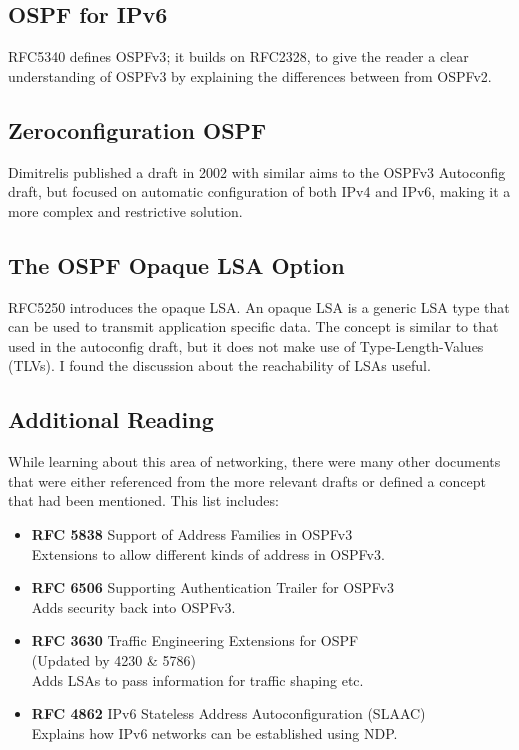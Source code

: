 \documentclass[12pt,a4paper,twoside]{report}
\begin{document}
\subsection{OSPF for IPv6}
RFC5340 defines OSPFv3\cite{rfc5340}; it builds on RFC2328, to give the
reader a clear understanding of OSPFv3 by explaining the differences between
from OSPFv2. 

\subsection{Zeroconfiguration OSPF}
Dimitrelis\cite{draft-dimitri-zospf-00} published a draft in 2002 with similar
aims to the OSPFv3 Autoconfig draft, but focused on automatic configuration of
both IPv4 and IPv6, making it a more complex and restrictive solution. 

\subsection{The OSPF Opaque LSA Option}
RFC5250\cite{rfc5250} introduces the opaque LSA\@. An opaque LSA is a generic
LSA type that can be used to transmit application specific data. The concept is
similar to that used in the autoconfig draft, but it does not make use
of Type-Length-Values (TLVs). I found the
discussion about the reachability of LSAs useful.

\subsection{Additional Reading}
While learning about this area of networking, there were many other documents
that were either referenced from the more relevant drafts or defined a concept
that had been mentioned. This list includes:

\begin{itemize} 
  \item {\bf RFC 5838} Support of Address Families in OSPFv3 \cite{rfc5838}
	\\ Extensions to allow different kinds of address in OSPFv3.
  
\item {\bf RFC 6506} Supporting Authentication Trailer for OSPFv3  \cite{rfc6506}
	\\ Adds security back into OSPFv3.

	\item {\bf RFC 3630}  Traffic Engineering Extensions
	for OSPF \cite{rfc3630} 
	\\ (Updated by 4230 \& 5786) \cite{rfc4230}\cite{rfc5786} 
	\\ Adds LSAs to pass information for traffic shaping etc.\@
  
\item {\bf RFC 4862} IPv6 Stateless Address Autoconfiguration (SLAAC) \cite{rfc4862}
	\\ Explains how IPv6 networks can be established using NDP.\@

\end{itemize}
\end{document}
